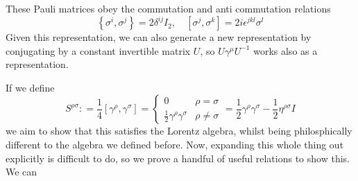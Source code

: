 These Pauli matrices 
obey the commutation and anti commutation relations 
\[
 \left\{  \sigma ^ i , \sigma ^ j  \right\}  = 2 \delta ^{ ij } I _ 2 , 
 \quad [ \sigma ^ j , \sigma ^ k ] =  2i \epsilon ^{ jkl } \sigma ^ l 
\] Given this representation, we can also 
generate a new representation by conjugating by a constant 
invertible matrix $ U$, so $ U \gamma ^ \mu U ^{ - 1} $  works 
also as a representation. 

If we define 
\[
	S ^{ \rho\sigma } : = \frac{1}{4} [  \gamma ^ \rho ,  \gamma ^ \sigma ] 
	= \begin{cases}
		0 & \rho = \sigma \\ 
		\frac{1}{2  } \gamma ^ \rho \gamma ^ \sigma &  \rho \neq \sigma 
	\end{cases}
	 = \frac{1}{2 } \gamma ^ \rho \gamma ^ \sigma  - \frac{1}{2 } \eta ^{ \rho \sigma } I 
\] we aim to show that this satisfies 
the Lorentz algebra, whilst being philosphically different 
to the algebra we defined before. 
Now, expanding this whole thing out explicitly is difficult to 
do, so we prove a handful of useful relations to show this. We can 
 
